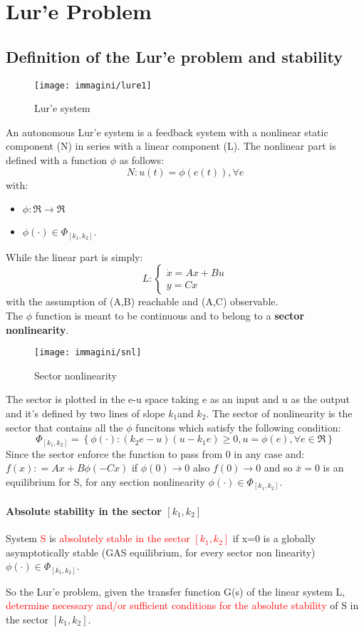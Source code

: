 \chapter{Lur'e Problem}
\section{Definition of the Lur'e problem and stability}
\begin{figure}[H]
	\centering
	\texttt{[image: immagini/lure1]}
	\caption{Lur'e system}
	\label{fig:lure1}
\end{figure}
An autonomous Lur'e system is a feedback system with a nonlinear static component (N) in series with a linear component (L). The nonlinear part is defined with a function $\phi$ as follows: 
\[
N \colon u(t)=\phi(e(t)), \forall e 
\]with:
\begin{itemize}
		\item $\phi \colon \Re \to \Re$
		\item $\phi(\cdot) \in \Phi_{\left[k_1,k_2\right]}$.
\end{itemize}
While the linear part is simply:
\[
L:  \begin{cases}
	\dot{x}=Ax+Bu \\ y=Cx
\end{cases}
\] with the assumption of (A,B) reachable and (A,C) observable.
\\ The $\phi$ function is meant to be continuous and to belong to a \textbf{sector nonlinearity}.
\begin{figure}[H]
	\centering
	\texttt{[image: immagini/snl]}
	\caption{Sector nonlinearity}
	\label{fig:snl}
\end{figure}
The sector is plotted in the e-u space taking e as an input and u as the output and it's defined by two lines of slope $k_1$and $k_2$. The sector of nonlinearity is the sector that contains all the $\phi$ funcitons which satisfy the following condition:
\[
\Phi_{\left[k_1,k_2\right]}=\left\{\phi(\cdot)\colon (k_2e-u)(u-k_1e)\ge 0, u=\phi(e), \forall e \in \Re\right\}
\]
Since the sector enforce the function to pass from 0 in any case and: $f(x)\colon=Ax+B\phi(-Cx)$ if $\phi(0)\to 0$ also $f(0)\to 0$ and so $\bar{x}=0$ is an equilibrium for S, for any section nonlinearity $\phi(\cdot) \in \Phi_{\left[k_1,k_2\right]}$.
\subsubsection{Absolute stability in the sector $[k_1,k_2]$}
\begin{defn}
	System \textcolor{red}{S} is \textcolor{red}{absolutely stable in the sector $[k_1,k_2]$} if x=0 is a globally asymptotically stable (GAS equilibrium, for every sector non linearity) $\phi(\cdot) \in \Phi_{\left[k_1,k_2\right]}$.
\end{defn}
So the Lur'e problem, given the transfer function G(s) of the linear system L, \textcolor{red}{determine necessary and/or sufficient conditions for the absolute stability} of S in the sector $[k_1,k_2]$.
